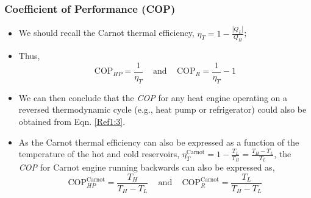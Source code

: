 \documentclass[10pt,compress,handout,ignorenonframetext]{beamer}
\newcommand{\frc}{\displaystyle\frac}
\begin{document}
\begin{frame}
 \frametitle{Coefficient of Performance (COP)}
 \begin{itemize}
  \item <1-> We should recall the Carnot thermal efficiency, $\eta_{T}=1-\frc{|Q_{L}|}{Q_{H}}$;
  \item <2-> Thus,
   \begin{equation}
    \text{COP}_{HP}=\frc{1}{\eta_{T}}\;\;\;\text{ and }\;\;\;\text{COP}_{R}=\frc{1}{\eta_{T}}-1
     \label{Ref1:3}
   \end{equation}
  \item <3-> We can then conclude that the {\it COP} for any heat engine operating on a reversed thermodynamic cycle (e.g., heat pump or refrigerator) could also be obtained from Eqn. \ref{Ref1:3}. 
  \item <4-> As the Carnot thermal efficiency can also be expressed as a function of the temperature of the hot and cold reservoirs, $\eta_{T}^{\text{Carnot}}=1-\frc{T_{L}}{T_{H}}=\frc{T_{H}-T_{L}}{T_{L}}$, the {\it COP} for Carnot engine running backwards can also be expressed as,
\begin{equation}
\text{COP}_{HP}^{\text{Carnot}}=\frc{T_{H}}{T_{H}-T_{L}}\;\;\;\text{ and }\;\;\; \text{COP}_{R}^{\text{Carnot}}=\frc{T_{L}}{T_{H}-T_{L}}
\end{equation}
 \end{itemize}
\end{frame}
\end{document}

